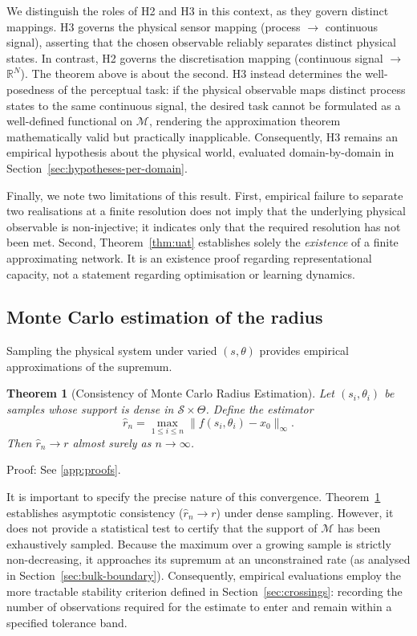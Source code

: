 \documentclass[10pt]{article}
\theoremstyle{plain}
\newtheorem{theorem}{Theorem}[section]
\theoremstyle{definition}
\theoremstyle{remark}
\begin{document}
We distinguish the roles of H2 and H3 in this context, as they
govern distinct mappings. H3 governs the physical sensor mapping (process $\to$
continuous signal), asserting that the chosen observable reliably separates
distinct physical states. In contrast, H2 governs the discretisation mapping
(continuous signal $\to$ $\mathbb{R}^N$). The theorem above is about the second. H3 instead determines the well-posedness of the perceptual
task: if the physical observable maps distinct process states to the same
continuous signal, the desired task cannot be formulated as a well-defined
functional on $\mathcal{M}$, rendering the approximation theorem mathematically
valid but practically inapplicable. Consequently, H3 remains an empirical
hypothesis about the physical world, evaluated domain-by-domain in
Section~\ref{sec:hypotheses-per-domain}.

Finally, we note two limitations of this result. First, empirical failure to
separate two realisations at a finite resolution does not imply that the
underlying physical observable is non-injective; it indicates only that the
required resolution has not been met. Second, Theorem~\ref{thm:uat} establishes
solely the \emph{existence} of a finite approximating network. It is an existence
proof regarding representational capacity, not a statement regarding optimisation
or learning dynamics.


\subsection{Monte Carlo estimation of the radius}

Sampling the physical system under varied $(s,\theta)$ provides empirical 
approximations of the supremum.

\begin{theorem}[Consistency of Monte Carlo Radius Estimation]
\label{thm:mc}
Let $(s_i,\theta_i)$ be samples whose support is dense in $\mathcal{S}\times\Theta$.
Define the estimator
\[
\hat{r}_n = \max_{1\le i \le n} \|f(s_i,\theta_i) - x_0\|_\infty.
\]
Then $\hat{r}_n \to r$ almost surely as $n\to\infty$.
\end{theorem}

\noindent Proof: See \ref{app:proofs}.

It is important to specify the precise nature of this convergence.
Theorem~\ref{thm:mc} establishes asymptotic consistency ($\hat{r}_n \to r$) under
dense sampling. However, it does not provide a statistical test to certify that
the support of $\mathcal{M}$ has been exhaustively sampled. Because the maximum
over a growing sample is strictly non-decreasing, it approaches its supremum at
an unconstrained rate (as analysed in Section~\ref{sec:bulk-boundary}).
Consequently, empirical evaluations employ the more tractable stability criterion
defined in Section~\ref{sec:crossings}: recording the number of observations
required for the estimate to enter and remain within a specified tolerance band.
\end{document}
